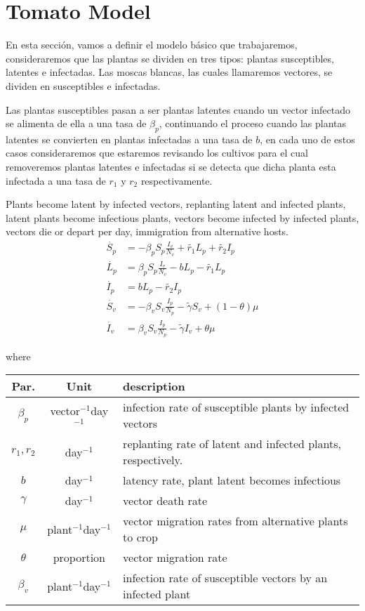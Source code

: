 \section{Tomato Model}
En esta secci\'on, vamos a definir el modelo b\'asico que trabajaremos, consideraremos que las plantas se dividen en tres tipos: plantas susceptibles, latentes e infectadas. Las moscas blancas, las cuales llamaremos vectores, se dividen en susceptibles e infectadas.

Las plantas susceptibles pasan a ser plantas latentes cuando un vector infectado se alimenta de ella a una tasa de $\beta_p$, continuando el proceso cuando las plantas latentes se convierten en plantas infectadas a una tasa de $b$, en cada uno de estos casos consideraremos que estaremos revisando los cultivos para el cual removeremos plantas latentes e infectadas si se detecta que dicha planta esta infectada a una tasa de $r_1$ y $r_2$ respectivamente.

Plants become latent by
infected vectors,
replanting latent and
infected plants,
latent plants become
infectious plants,
vectors become infected by
infected plants,
vectors die or depart per
day,
immigration from
alternative hosts.
\begin{equation}\label{system_1}
	\begin{aligned}
		\dot{S_p} &=
			-\beta_p S_p \frac{I_v}{N_v} + \tilde{r_1} L_p + \tilde{r_2} I_p \\
		\dot{L_p} &=
			\beta_p S_p \frac{I_v}{N_v} - b L_p - \tilde{r_1} L_p \\
		\dot{I_p} &=
			b L_p - \tilde{r_2} I_p \\
		\dot{S_v} &=
			-\beta_v S_v \frac{I_p}{N_p} -\tilde{\gamma} S_v +(1-\theta) \mu \\
		\dot{I_v} &=
			\beta_v S_v \frac{I_p}{N_p} -\tilde{\gamma} I_v + \theta \mu
	\end{aligned}
\end{equation}

where
\begin{center}
	\begin{tabular}{|c |c |l |} 
		\hline
		Par. & Unit & description \\ [0.5ex] 
		\hline
		$\beta_p$ & vector$^{-1}$day$^{-1}$ & infection rate of susceptible plants by infected vectors \\ 
		\hline
		$r_1,r_2$ & day$^{-1}$ & replanting rate of latent and infected plants, respectively. \\
		\hline
		$b$ & day$^{-1}$ & latency rate, plant latent becomes infectious \\
		\hline
		$\gamma$ & day$^{-1}$ & vector death rate \\
		\hline
		$\mu$ & plant$^{-1}$day$^{-1}$ & vector migration rates from alternative plants to crop\\
		\hline
		$\theta$ & proportion & vector migration rate\\
		\hline
		$\beta_v$ & plant$^{-1}$day$^{-1}$ & infection rate of susceptible vectors by an infected plant\\ 
		\hline
	\end{tabular}
\end{center}

